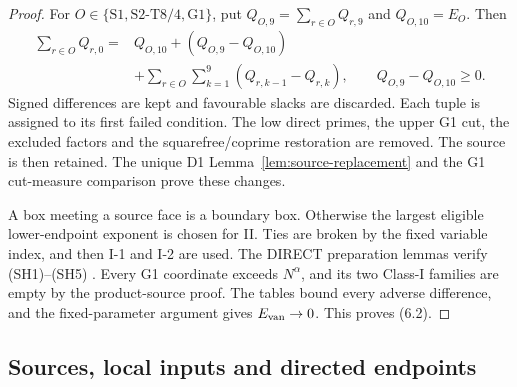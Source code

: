\begin{proof}
For $O\in\{\mathrm{S1},\mathrm{S2\text{-}T8/4},\mathrm{G1}\}$,
put $Q_{O,9}=\sum_{r\in O}Q_{r,9}$ and $Q_{O,10}=E_O$.
Then
\[
\begin{split}
\sum_{r\in O}Q_{r,0}={}&Q_{O,10}+(Q_{O,9}-Q_{O,10})\\
&+\sum_{r\in O}\sum_{k=1}^{9}(Q_{r,k-1}-Q_{r,k}),
\qquad Q_{O,9}-Q_{O,10}\ge0.
\end{split}\tag{6.4d}
\]
Signed differences are kept and favourable slacks are discarded.
Each tuple is assigned to its first failed condition.
The low direct primes, the upper G1 cut, the excluded factors and the squarefree/coprime restoration are removed.
The source is then retained.
The unique D1 Lemma~\ref{lem:source-replacement} and the G1
cut-measure comparison prove these changes.

A box meeting a source face is a boundary box.
Otherwise the largest eligible lower-endpoint exponent is chosen for II.
Ties are broken by the fixed variable index, and then I-1 and I-2 are used.
The DIRECT preparation lemmas verify (SH1)--(SH5)
\cite[\S3.11, (3.98)--(3.101)]{Z1}.
Every G1 coordinate exceeds $N^\alpha$,
and its two Class-I families are empty by the product-source proof.
The tables bound every adverse difference,
and the fixed-parameter argument gives $E_{\rm van}\to0$.
This proves (6.2).
\end{proof}

\subsection{Sources, local inputs and directed endpoints}


